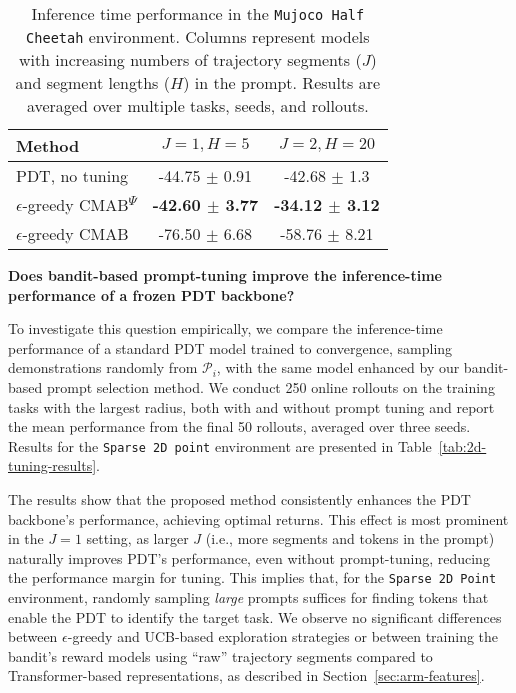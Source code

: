 \documentclass{article} %
\begin{document}
\begin{table}[]
\centering
\begin{tabular}{lcc}
Method & $J=1, H=5$ & $J=2, H=20$ \\
\hline
PDT, no tuning & -44.75 $\pm$ 0.91 &  -42.68 $\pm$ 1.3\\
$\epsilon$-greedy CMAB\textsuperscript{$\Psi$} & \textbf{-42.60 $\pm$ 3.77} & \textbf{ -34.12 $\pm$ 3.12}\\
$\epsilon$-greedy CMAB & -76.50 $\pm$ 6.68  &  -58.76 $\pm$ 8.21\\
\hline
\end{tabular}
\caption{Inference time performance in the \texttt{Mujoco Half Cheetah} environment. Columns represent models with increasing numbers of trajectory segments ($J$) and segment lengths ($H$) in the prompt. Results are
averaged over multiple tasks, seeds, and rollouts.}\label{tab:half-cheetah-results}
\end{table}


\textbf{Does bandit-based prompt-tuning improve the inference-time performance of a frozen PDT backbone?}

To investigate this question empirically, we compare the inference-time performance of a standard PDT model trained to convergence, sampling demonstrations randomly from $\mathcal{P}_i$, with the same model enhanced by our bandit-based prompt selection method. 
We conduct 250 online rollouts 
on the training tasks with the largest radius,
both with and without prompt tuning and report the mean performance from the final 50 rollouts, averaged over three seeds. Results for the \texttt{Sparse 2D point} environment are presented in Table~\ref{tab:2d-tuning-results}.

The results show that the proposed method consistently enhances the PDT backbone's performance, achieving optimal returns. This effect is most prominent in the $J=1$ setting, as larger $J$ (i.e., more segments and tokens in the prompt) naturally improves PDT's performance, even without prompt-tuning, reducing the performance margin for tuning. 
This implies that, for the \texttt{Sparse 2D Point} environment, randomly sampling \textit{large} prompts suffices for finding tokens that enable the PDT to identify the target task.
We observe no significant differences between $\epsilon$-greedy and UCB-based exploration strategies or between training the bandit's reward models using ``raw'' trajectory segments compared to Transformer-based representations, as described in Section~\ref{sec:arm-features}.
\end{document}
